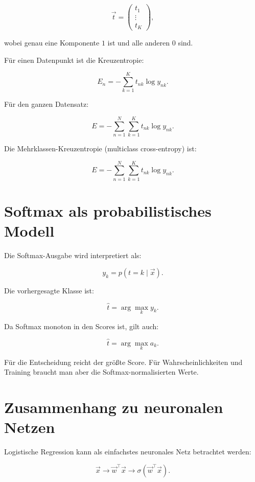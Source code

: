 \[
    \vec{t}
    =
    \begin{pmatrix}
        t_1 \\
        \vdots \\
        t_K
    \end{pmatrix},
\]

wobei genau eine Komponente \(1\) ist und alle anderen \(0\) sind.

Für einen Datenpunkt ist die Kreuzentropie:

\[
    E_n
    =
    -\sum_{k=1}^{K}
    t_{nk}\log y_{nk}.
\]

Für den ganzen Datensatz:

\[
    E
    =
    -\sum_{n=1}^{N}
    \sum_{k=1}^{K}
    t_{nk}\log y_{nk}.
\]

\begin{definitionbox}
Die Mehrklassen-Kreuzentropie (multiclass cross-entropy) ist:

\[
    E
    =
    -\sum_{n=1}^{N}
    \sum_{k=1}^{K}
    t_{nk}\log y_{nk}.
\]
\end{definitionbox}

\section{Softmax als probabilistisches Modell}

Die Softmax-Ausgabe wird interpretiert als:

\[
    y_k
    =
    p(t=k\mid\vec{x}).
\]

Die vorhergesagte Klasse ist:

\[
    \hat{t}
    =
    \arg\max_{k}
    y_k.
\]

Da Softmax monoton in den Scores ist, gilt auch:

\[
    \hat{t}
    =
    \arg\max_{k}
    a_k.
\]

\begin{notebox}
Für die Entscheidung reicht der größte Score.
Für Wahrscheinlichkeiten und Training braucht man aber die Softmax-normalisierten Werte.
\end{notebox}

\section{Zusammenhang zu neuronalen Netzen}

Logistische Regression kann als einfachstes neuronales Netz betrachtet werden:

\[
    \vec{x}
    \longrightarrow
    \vec{w}^{\top}\vec{x}
    \longrightarrow
    \sigma(\vec{w}^{\top}\vec{x}).
\]

